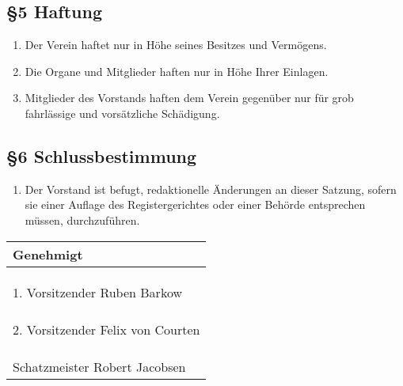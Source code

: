 \documentclass[12pt,a4paper]{article}
\newcommand{\VorstandEins}{Ruben Barkow}
\newcommand{\VorstandZwei}{Felix von Courten}
\newcommand{\Schatzmeister}{Robert Jacobsen}
\begin{document}
\subsection*{§5 Haftung}
\begin{enumerate}
\item Der Verein haftet nur in Höhe seines Besitzes und Vermögens.
\item Die Organe und Mitglieder haften nur in Höhe Ihrer Einlagen.
\item Mitglieder des Vorstands haften dem Verein gegenüber nur für grob fahrlässige und vorsätzliche Schädigung.
\end{enumerate}

\subsection*{§6 Schlussbestimmung}
\begin{enumerate}
\item Der Vorstand ist befugt, redaktionelle Änderungen an dieser Satzung, sofern sie einer Auflage des Registergerichtes oder einer Behörde entsprechen müssen, durchzuführen.
\end{enumerate}
\bigskip
\begin{center}

\begin{tabular}{|p{15cm}|}
\hline 
Genehmigt \\ 
\hline 
 \\
 \\
 \\
\hline 
1. Vorsitzender \VorstandEins \\ 
\hline 
 \\
 \\
 \\
\hline 
2. Vorsitzender \VorstandZwei \\ 
\hline
 \\
 \\
 \\
\hline
Schatzmeister \Schatzmeister \\
\hline
\end{tabular} 

\end{center}
\end{document}
